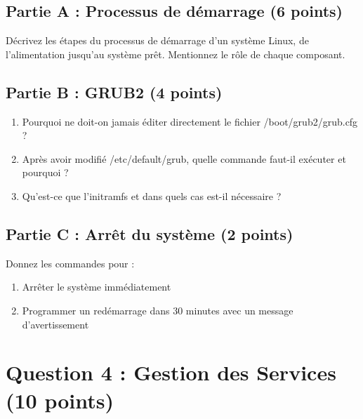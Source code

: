 \documentclass[12pt,a4paper]{article}
\begin{document}
\begin{questionbox}
\subsection*{Partie A : Processus de démarrage (6 points)}
Décrivez les étapes du processus de démarrage d'un système Linux, de l'alimentation jusqu'au système prêt. Mentionnez le rôle de chaque composant.

\subsection*{Partie B : GRUB2 (4 points)}
\begin{enumerate}[label=\alph*)]
    \item Pourquoi ne doit-on jamais éditer directement le fichier /boot/grub2/grub.cfg ?
    \item Après avoir modifié /etc/default/grub, quelle commande faut-il exécuter et pourquoi ?
    \item Qu'est-ce que l'initramfs et dans quels cas est-il nécessaire ?
\end{enumerate}

\subsection*{Partie C : Arrêt du système (2 points)}
Donnez les commandes pour :
\begin{enumerate}[label=\alph*)]
    \item Arrêter le système immédiatement
    \item Programmer un redémarrage dans 30 minutes avec un message d'avertissement
\end{enumerate}
\end{questionbox}

\newpage


\section{Question 4 : Gestion des Services (10 points)}
\end{document}
